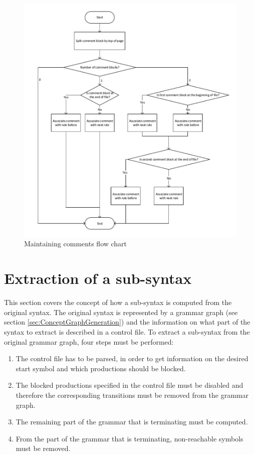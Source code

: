 \begin{figure}[H]
\centering
\includegraphics[width=1\textwidth]{images/Concept_maintaining_comments.pdf}
\caption{Maintaining comments flow chart}
\label{fig:ConceptMaintainingComments}
\end{figure}

\section{Extraction of a sub-syntax}\label{sec:ConceptExtractReducedGrammar}

This section covers the concept of how a sub-syntax is computed from the original syntax.
The original syntax is represented by a grammar graph (see section \ref{sec:ConceptGraphGeneration}) and the information on what part of the syntax to extract is described in a control file.
To extract a sub-syntax from the original grammar graph, four steps must be performed:
\begin{enumerate}%
	\item The control file has to be parsed, in order to get information on the desired start symbol and which productions should be blocked.
	\item The blocked productions specified in the control file must be disabled and therefore the corresponding transitions must be removed from the grammar graph.
	\item The remaining part of the grammar that is terminating must be computed.
	\item From the part of the grammar that is terminating, non-reachable symbols must be removed.
\end{enumerate}

